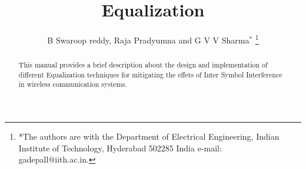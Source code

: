 \documentclass[journal,12pt,twocolumn]{IEEEtran}
\begin{document}
\let\StandardTheFigure\thefigure
\let\StandardTheTable\thetable
\def\putbox#1#2#3{\makebox[0in][l]{\makebox[#1][l]{}\raisebox{\baselineskip}[0in][0in]{\raisebox{#2}[0in][0in]{#3}}}}
     \def\rightbox#1{\makebox[0in][r]{#1}}
     \def\centbox#1{\makebox[0in]{#1}}
     \def\topbox#1{\raisebox{-\baselineskip}[0in][0in]{#1}}
     \def\midbox#1{\raisebox{-0.5\baselineskip}[0in][0in]{#1}}
\title{ 
Equalization %
}
\author{ B Swaroop reddy, Raja Pradyumna  and G V V 
Sharma$^{*}$%
\thanks{*The authors are with the Department
of Electrical Engineering, Indian Institute of Technology, Hyderabad
502285 India e-mail:  gadepall@iith.ac.in.}
}
\maketitle
\bigskip
%
\begin{abstract}
This manual provides a brief description about the design and implementation of different Equalization techniques for mitigating the effets of Inter Symbol Interference in wireless communication systems.
\end{abstract}
%
\end{document}
